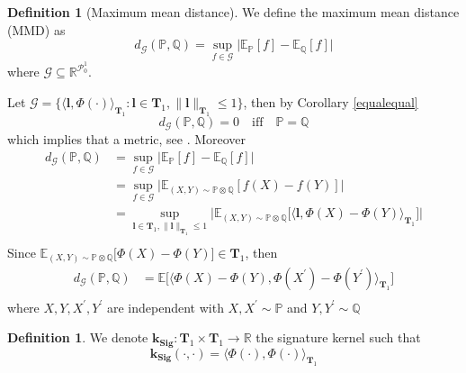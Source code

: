 \documentclass[12pt]{report}
\theoremstyle{definition}
\newtheorem{definition}[theorem]{Definition}
\theoremstyle{remark}
\newcommand{\R}{\mathbb{R}}
\newcommand{\E}{\mathbb{E}}
\renewcommand{\P}{\mathbb{P}}
\begin{document}
\begin{definition}[Maximum mean distance]
  We define the maximum mean distance (MMD) as 
  \begin{equation}
    d_{\mathcal{G}}(\P,\mathbb{Q}) = \sup_{f\in\mathcal{G}}\lvert \E_{\P}[f] - \E_{\mathbb{Q}}[f]\rvert 
  \end{equation}
  where $\mathcal{G} \subseteq \R^{\mathcal{P}_{0}^{1}}$.
\end{definition}
Let $ \mathcal{G} = \{\langle\mathbf{l},\Phi(\cdot)\rangle_{\mathbf{T}_{1}} \colon \mathbf{l} \in \mathbf{T}_{1}, \lVert \mathbf{l}\rVert_{\mathbf{T}_{1}} \leq 1\}$, then by Corollary \ref{equalequal}
\begin{equation}
  d_{\mathcal{G}}(\P,\mathbb{Q}) = 0\quad\text{iff}\quad \P = \mathbb{Q}
\end{equation}
which implies that  a metric, see \cite{1993Probability}. Moreover 
\begin{equation}
  \begin{split}
    d_{\mathcal{G}}(\P,\mathbb{Q}) &= \sup_{f\in\mathcal{G}}\lvert \E_{\P}[f] - \E_{\mathbb{Q}}[f]\rvert \\
    &= \sup_{f\in\mathcal{G}}\Big\lvert \E_{(X,Y) \sim \P\otimes\mathbb{Q}}[f(X) - f(Y)]\Big\rvert \\  
    &= \sup_{\mathbf{l} \in \mathbf{T}_{1}, \lVert \mathbf{l}\rVert_{\mathbf{T}_{1}} \leq 1}\Big\lvert \E_{(X,Y) \sim \P\otimes\mathbb{Q}}\big[\langle \mathbf{l}, \Phi(X) - \Phi(Y)\rangle_{\mathbf{T}_{1}}\big]\Big\rvert \\  
  \end{split}
\end{equation}
Since $\E_{(X,Y) \sim \P\otimes\mathbb{Q}}\big[\Phi(X) - \Phi(Y)\big] \in \mathbf{T}_{1}$, then 
\begin{equation}\label{eq348}
  \begin{split}
    d_{\mathcal{G}}(\P,\mathbb{Q}) &= \E\big[\langle \Phi(X) - \Phi(Y), \Phi(X^{\prime}) - \Phi(Y^{\prime})\rangle_{\mathbf{T}_{1}}\big]\\
  \end{split}
\end{equation}
where $X,Y,X^{\prime},Y^{\prime}$ are independent with $X,X^{\prime}\sim\P$ and $Y,Y^{\prime}\sim\mathbb{Q}$
\begin{definition}
  We denote $\mathbf{k_{Sig}}\colon \mathbf{T}_{1}\times\mathbf{T}_{1} \to \R$ the signature kernel such that 
  \begin{equation}
    \mathbf{k_{Sig}}(\cdot,\cdot) = \langle \Phi(\cdot),\Phi(\cdot)\rangle_{\mathbf{T}_{1}}
  \end{equation}
\end{definition}
\end{document}
